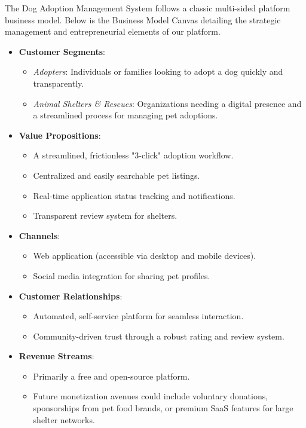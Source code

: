 The Dog Adoption Management System follows a classic multi-sided platform business model. Below is the Business Model Canvas detailing the strategic management and entrepreneurial elements of our platform.

\begin{itemize}
    \item \textbf{Customer Segments}: 
    \begin{itemize}
        \item \textit{Adopters}: Individuals or families looking to adopt a dog quickly and transparently.
        \item \textit{Animal Shelters \& Rescues}: Organizations needing a digital presence and a streamlined process for managing pet adoptions.
    \end{itemize}
    
    \item \textbf{Value Propositions}: 
    \begin{itemize}
        \item A streamlined, frictionless "3-click" adoption workflow.
        \item Centralized and easily searchable pet listings.
        \item Real-time application status tracking and notifications.
        \item Transparent review system for shelters.
    \end{itemize}
    
    \item \textbf{Channels}: 
    \begin{itemize}
        \item Web application (accessible via desktop and mobile devices).
        \item Social media integration for sharing pet profiles.
    \end{itemize}
    
    \item \textbf{Customer Relationships}: 
    \begin{itemize}
        \item Automated, self-service platform for seamless interaction.
        \item Community-driven trust through a robust rating and review system.
    \end{itemize}
    
    \item \textbf{Revenue Streams}: 
    \begin{itemize}
        \item Primarily a free and open-source platform.
        \item Future monetization avenues could include voluntary donations, sponsorships from pet food brands, or premium SaaS features for large shelter networks.
    \end{itemize}
    

\end{itemize}
